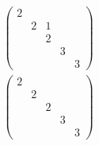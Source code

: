 \documentclass[10pt]{mypackage}
\begin{document}
\begin{solution}
\begin{align*}
 \begin{pmatrix}
2 &  &  &  &  \\
 & 2 & 1 &  &  \\
 &  & 2 &  &  \\
 &  &  & 3 &  \\
 &  &  &  & 3 
\end{pmatrix}\\
 \begin{pmatrix}
2 &  &  &  &  \\
 & 2 &  &  &  \\
 &  & 2 &  &  \\
 &  &  & 3 &  \\
 &  &  &  & 3 
\end{pmatrix}  
  \end{align*}
  
\end{solution}
\end{document}
